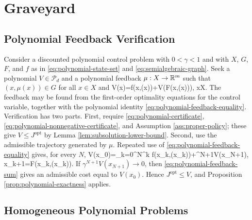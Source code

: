 \documentclass{article}
\begin{document}
\section{Graveyard}

\subsection{Polynomial Feedback Verification}

Consider a discounted polynomial control problem with $0<\gamma<1$ and with $X$, $G$, $F$, and $f$ as in \eqref{eq:polynomial-state-set} and \eqref{eq:semialgebraic-graph}. Seek a polynomial $V\in\mathcal P_d$ and a polynomial feedback $\mu:X\rightarrow\mathbb{R}^m$ such that $(x,\mu(x))\in G$ for all $x\in X$ and
\BEQ
V(x)=f(x,\mu(x))+\gamma V(F(x,\mu(x))),
\quad x\in X.
\label{eq:polynomial-feedback-equality}
\EEQ
The feedback may be found from the first-order optimality equations for the control variable, together with the polynomial identity \eqref{eq:polynomial-feedback-equality}. Verification has two parts. First, require \eqref{eq:polynomial-certificate}, \eqref{eq:polynomial-nonnegative-certificate}, and Assumption \ref{ass:proper-policy}; these give $V\leq J^\textrm{opt}$ by Lemma \ref{lem:subsolution-lower-bound}. Second, use the admissible trajectory generated by $\mu$. Repeated use of \eqref{eq:polynomial-feedback-equality} gives, for every $N$,
\BEQ
V(x_0)=\sum_{k=0}^N\gamma^k f(x_k,\mu(x_k))+\gamma^{N+1}V(x_{N+1}),
\quad x_{k+1}=F(x_k,\mu(x_k)).
\label{eq:polynomial-feedback-sum}
\EEQ
If $\gamma^{N+1}V(x_{N+1})\rightarrow0$, then \eqref{eq:polynomial-feedback-sum} gives an admissible cost equal to $V(x_0)$. Hence $J^\textrm{opt}\leq V$, and Proposition \ref{prop:polynomial-exactness} applies.

\subsection{Homogeneous Polynomial Problems}
\end{document}
